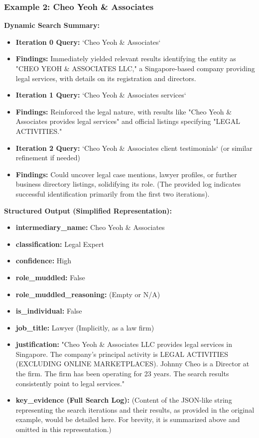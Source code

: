 \subsubsection*{Example 2: Cheo Yeoh \& Associates}
\textbf{Dynamic Search Summary:}
\begin{itemize}
    \item \textbf{Iteration 0 Query:} `Cheo Yeoh \& Associates`
    \item \textbf{Findings:} Immediately yielded relevant results identifying the entity as "CHEO YEOH \& ASSOCIATES LLC," a Singapore-based company providing legal services, with details on its registration and directors.
    \item \textbf{Iteration 1 Query:} `Cheo Yeoh \& Associates services`
    \item \textbf{Findings:} Reinforced the legal nature, with results like "Cheo Yeoh \& Associates provides legal services" and official listings specifying "LEGAL ACTIVITIES."
    \item \textbf{Iteration 2 Query:} `Cheo Yeoh \& Associates client testimonials` (or similar refinement if needed)
    \item \textbf{Findings:} Could uncover legal case mentions, lawyer profiles, or further business directory listings, solidifying its role. (The provided log indicates successful identification primarily from the first two iterations).
\end{itemize}

\textbf{Structured Output (Simplified Representation):}
\begin{itemize}
    \item \textbf{intermediary\_name:} Cheo Yeoh \& Associates
    \item \textbf{classification:} Legal Expert
    \item \textbf{confidence:} High
    \item \textbf{role\_muddled:} False
    \item \textbf{role\_muddled\_reasoning:} (Empty or N/A)
    \item \textbf{is\_individual:} False
    \item \textbf{job\_title:} Lawyer (Implicitly, as a law firm)
    \item \textbf{justification:} "Cheo Yeoh \& Associates LLC provides legal services in Singapore. The company's principal activity is LEGAL ACTIVITIES (EXCLUDING ONLINE MARKETPLACES). Johnny Cheo is a Director at the firm. The firm has been operating for 23 years. The search results consistently point to legal services."
    \item \textbf{key\_evidence (Full Search Log):} (Content of the JSON-like string representing the search iterations and their results, as provided in the original example, would be detailed here. For brevity, it is summarized above and omitted in this representation.)
\end{itemize}



